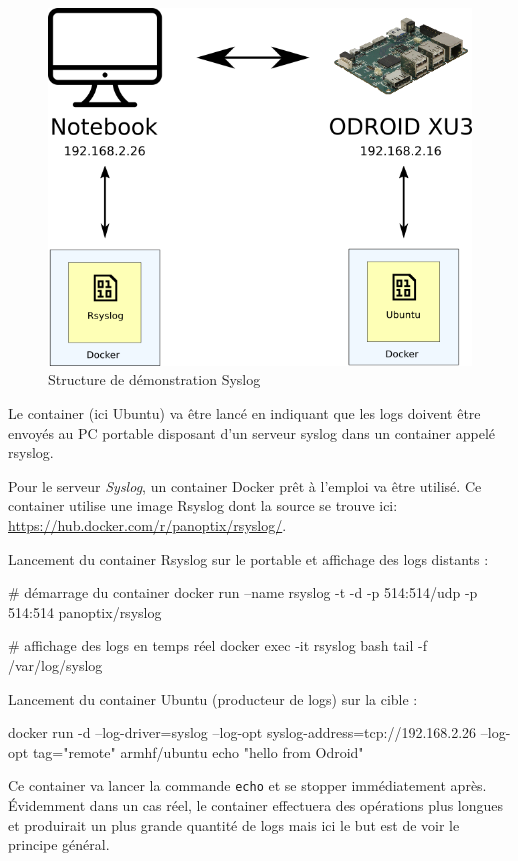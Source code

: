 \documentclass[11pt,a4paper,oneside]{report}
\newcommand{\code}[1]{\texttt{#1}}
\begin{document}
\begin{figure}[H]
\centering
\includegraphics[scale=0.7]{img/docker_syslog.png}
\caption{Structure de démonstration Syslog}
\end{figure}

Le container (ici Ubuntu) va être lancé en indiquant que les logs doivent être envoyés au PC portable disposant d'un serveur syslog dans un container appelé rsyslog.

Pour le serveur \textit{Syslog}, un container Docker prêt à l'emploi va être utilisé. Ce container utilise une image Rsyslog dont la source se trouve ici: \url{https://hub.docker.com/r/panoptix/rsyslog/}.

Lancement du container Rsyslog sur le portable et affichage des logs distants :
\begin{bashcode}
# démarrage du container
docker run --name rsyslog -t -d -p 514:514/udp -p 514:514 panoptix/rsyslog

# affichage des logs en temps réel
docker exec -it rsyslog bash
tail -f /var/log/syslog
\end{bashcode}

Lancement du container Ubuntu (producteur de logs) sur la cible :
\begin{bashcode}
docker run -d --log-driver=syslog --log-opt syslog-address=tcp://192.168.2.26 --log-opt tag="remote" armhf/ubuntu echo "hello from Odroid"
\end{bashcode}

Ce container va lancer la commande \code{echo} et se stopper immédiatement après. Évidemment dans un cas réel, le container effectuera des opérations plus longues et produirait un plus grande quantité de logs mais ici le but est de voir le principe général.
\end{document}
